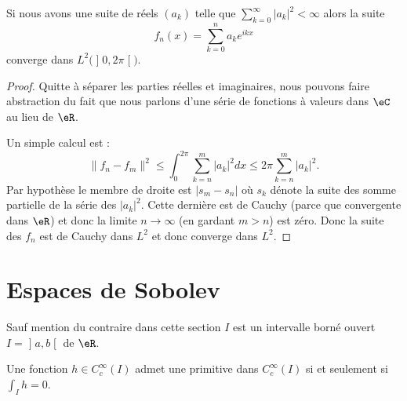 \begin{proposition}
    Si nous avons une suite de réels \( (a_k)\) telle que \( \sum_{k=0}^{\infty}| a_k |^2<\infty\) alors la suite
    \begin{equation}
        f_n(x)=\sum_{k=0}^na_k e^{ikx}
    \end{equation}
    converge dans \( L^2\big( \mathopen] 0 , 2\pi \mathclose[ \big)\).
\end{proposition}

\begin{proof}
    Quitte à séparer les parties réelles et imaginaires, nous pouvons faire abstraction du fait que nous parlons d'une série de fonctions à valeurs dans \( \eC\) au lieu de \( \eR\).

    Un simple calcul est :
    \begin{equation}    \label{EqHVdJxZT}
        \| f_n-f_m \|^2\leq\int_0^{2\pi}\sum_{k=n}^m| a_k |^2dx\leq 2\pi\sum_{k=n}^m| a_k |^2.
    \end{equation}
    Par hypothèse le membre de droite est \( | s_m-s_n |\) où \( s_k\) dénote la suite des somme partielle de la série des \( | a_k |^2\). Cette dernière est de Cauchy (parce que convergente dans \( \eR\)) et donc la limite \( n\to\infty\) (en gardant \( m>n\)) est zéro. Donc la suite des \( f_n\) est de Cauchy dans \( L^2\) et donc converge dans \( L^2\).
\end{proof}


\section{Espaces de Sobolev}

Sauf mention du contraire dans cette section \( I\) est un intervalle borné ouvert \( I=\mathopen] a , b \mathclose[\) de \( \eR\).

\begin{proposition} \label{PropHFWNpRb}
    Une fonction \( h\in C^{\infty}_c(I)\) admet une primitive dans \(  C^{\infty}_c(I)\) si et seulement si \( \int_Ih=0\).
\end{proposition}


